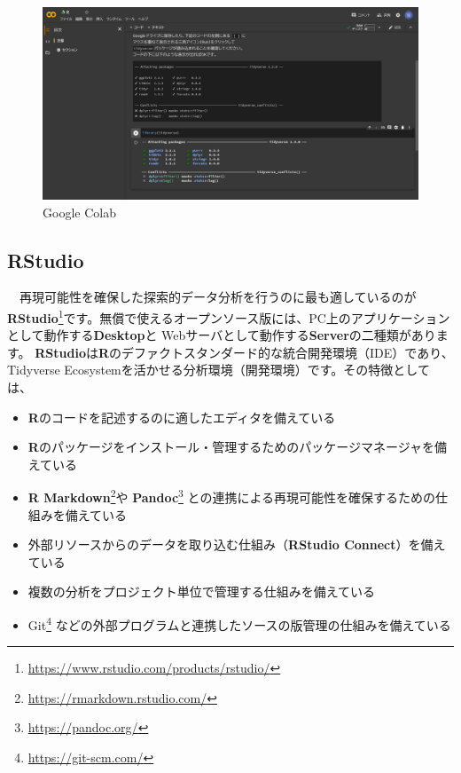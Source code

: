 \documentclass[
  12pt,
]{book}
\DeclareRobustCommand{\href}[2]{#2\footnote{\url{#1}}}
\providecommand{\tightlist}{%
  \setlength{\itemsep}{0pt}\setlength{\parskip}{0pt}}
\begin{document}
\begin{figure}[H]

{\centering \includegraphics[width=0.9\linewidth,]{./fig/Colab/Firsttime} 

}

\caption{Google Colab}\label{fig:unnamed-chunk-15}
\end{figure}

\hypertarget{rstudio}{%
\subsection{\texorpdfstring{RStudio}{RStudio}}\label{rstudio}}

　再現可能性を確保した探索的データ分析を行うのに最も適しているのが\href{https://www.rstudio.com/products/rstudio/}{\textbf{RStudio}}です。無償で使えるオープンソース版には、PC上のアプリケーションとして動作する\textbf{Desktop}と Webサーバとして動作する\textbf{Server}の二種類があります。 \textbf{RStudio}は\textbf{R}のデファクトスタンダード的な統合開発環境（IDE）であり、Tidyverse Ecosystemを活かせる分析環境（開発環境）です。その特徴としては、

\begin{itemize}
\tightlist
\item
  \textbf{R}のコードを記述するのに適したエディタを備えている
\item
  \textbf{R}のパッケージをインストール・管理するためのパッケージマネージャを備えている
\item
  \href{https://rmarkdown.rstudio.com/}{\textbf{R Markdown}}や \href{https://pandoc.org/}{\textbf{Pandoc}} との連携による再現可能性を確保するための仕組みを備えている
\item
  外部リソースからのデータを取り込む仕組み（\textbf{RStudio Connect}）を備えている
\item
  複数の分析をプロジェクト単位で管理する仕組みを備えている
\item
  \href{https://git-scm.com/}{Git} などの外部プログラムと連携したソースの版管理の仕組みを備えている
\end{itemize}
\end{document}
